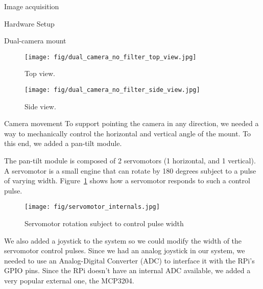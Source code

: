 \documentclass[11pt]{article}
\begin{document}
\begin{section}{Image acquisition}
\begin{subsection}{Hardware Setup}
\begin{subsubsection}{Dual-camera mount}
            \begin{figure}[!h]
                \centering
                \begin{minipage}[b]{0.4\textwidth}
                    \texttt{[image: fig/dual\_camera\_no\_filter\_top\_view.jpg]}
                    \caption{Top view.}
                \end{minipage} \hspace{0.5em} %
                \begin{minipage}[b]{0.4\textwidth}
                    \texttt{[image: fig/dual\_camera\_no\_filter\_side\_view.jpg]}
                    \caption{Side view.}
                \end{minipage}
            \end{figure}

        \end{subsubsection}
    \end{subsection} %

    \begin{subsubsection}{Camera movement}
        To support pointing the camera in any direction, we needed a way to mechanically control the horizontal and vertical angle of the mount. To this end, we added a pan-tilt module.

        \medskip

        The pan-tilt module is composed of 2 servomotors (1 horizontal, and 1 vertical). A servomotor is a small engine that can rotate by 180 degrees subject to a pulse of varying width. Figure~\ref{fig:servomotor_internals} shows how a servomotor responds to such a control pulse.

        \begin{figure}[!h]
            \begin{center}
                \texttt{[image: fig/servomotor\_internals.jpg]}
                \caption{Servomotor rotation subject to control pulse width}
                \label{fig:servomotor_internals}
            \end{center}
        \end{figure}

        \newpage

        We also added a joystick to the system so we could modify the width of the servomotor control pulses. Since we had an {analog} joystick in our system, we needed to use an Analog-Digital Converter (ADC) to interface it with the RPi's GPIO pins. Since the RPi doesn't have an internal ADC available, we added a very popular external one, the MCP3204.


\end{subsubsection}
\end{section}
\end{document}
